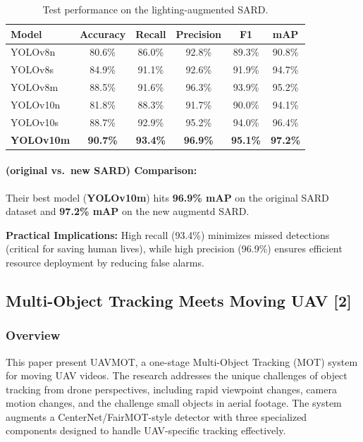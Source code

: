 \documentclass[12pt, a4paper]{report}
\begin{document}
\begin{table}[h]
\centering
\caption{Test performance on the lighting-augmented SARD.}
\begin{tabular}{lccccc}
\toprule
\textbf{Model} & \textbf{Accuracy} & \textbf{Recall} & \textbf{Precision} & \textbf{F1} & \textbf{mAP} \\
\midrule
YOLOv8n  & 80.6\% & 86.0\% & 92.8\% & 89.3\% & 90.8\% \\
YOLOv8s  & 84.9\% & 91.1\% & 92.6\% & 91.9\% & 94.7\% \\
YOLOv8m  & 88.5\% & 91.6\% & 96.3\% & 93.9\% & 95.2\% \\
YOLOv10n & 81.8\% & 88.3\% & 91.7\% & 90.0\% & 94.1\% \\
YOLOv10s & 88.7\% & 92.9\% & 95.2\% & 94.0\% & 96.4\% \\
\textbf{YOLOv10m} & \textbf{90.7\%} & \textbf{93.4\%} & \textbf{96.9\%} & \textbf{95.1\%} & \textbf{97.2\%} \\
\bottomrule
\end{tabular}
\label{tab:main}
\end{table}

\paragraph{(original vs.\ new SARD) Comparison:}
Their best model (\textbf{YOLOv10m}) hits \textbf{96.9\% mAP} on the original SARD dataset and \textbf{97.2\% mAP} on the new augmentd SARD.

\vspace{1cm}
\textbf{Practical Implications:} High recall (93.4\%) minimizes missed detections (critical for saving human lives), while high precision (96.9\%) ensures efficient resource deployment by reducing false alarms.

\subsection{Multi-Object Tracking Meets Moving UAV [2]}

\subsubsection{Overview}
This paper present UAVMOT, a one-stage Multi-Object Tracking (MOT) system for moving UAV videos. The research addresses the unique challenges of object tracking from drone perspectives, including rapid viewpoint changes, camera motion changes, and the challenge small objects in aerial footage. The system augments a CenterNet/FairMOT-style detector with three specialized components designed to handle UAV-specific tracking effectively.
\end{document}
